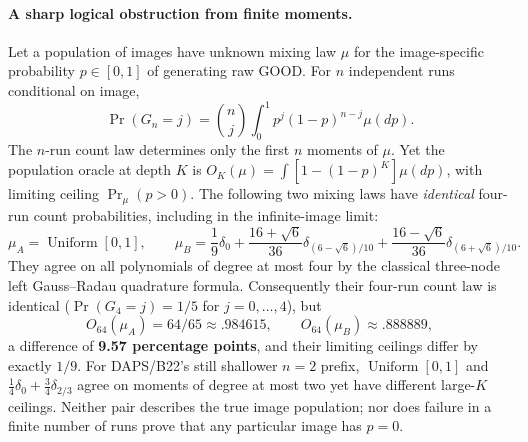 \paragraph{A sharp logical obstruction from finite moments.}
Let a population of images have unknown mixing law $\mu$ for the
image-specific probability $p\in[0,1]$ of generating raw GOOD.
For $n$ independent runs conditional on image,
\begin{equation}\label{eq:suppl-four-moments}
 \Pr(G_n=j)=\binom nj\int_0^1p^j(1-p)^{n-j}\mu(dp).
\end{equation}
The $n$-run count law determines only the first $n$ moments of
$\mu$. Yet the population oracle at depth $K$ is
$O_K(\mu)=\int[1-(1-p)^K]\mu(dp)$, with limiting ceiling
$\Pr_\mu(p>0)$. The following two mixing laws have \emph{identical}
four-run count probabilities, including in the infinite-image
limit:
\begin{equation}\label{eq:suppl-radau-witness}
 \mu_A=\operatorname{Uniform}[0,1],\qquad
 \mu_B=\frac19\delta_0+
 \frac{16+\sqrt6}{36}\delta_{(6-\sqrt6)/10}
 +\frac{16-\sqrt6}{36}\delta_{(6+\sqrt6)/10}.
\end{equation}
They agree on all polynomials of degree at most four by the
classical three-node left Gauss--Radau quadrature formula.
Consequently their four-run count law is identical
($\Pr(G_4=j)=1/5$ for $j=0,\dots,4$), but
\[
 O_{64}(\mu_A)=64/65\approx .984615,\qquad
 O_{64}(\mu_B)\approx .888889,
\]
a difference of \textbf{9.57 percentage points}, and their limiting
ceilings differ by exactly $1/9$. For DAPS/B22's still shallower
$n=2$ prefix, $\operatorname{Uniform}[0,1]$ and
$\tfrac14\delta_0+\tfrac34\delta_{2/3}$ agree on moments of
degree at most two yet have different large-$K$ ceilings.
Neither pair describes the true image population; nor does
failure in a finite number of runs prove that any particular
image has $p=0$.


